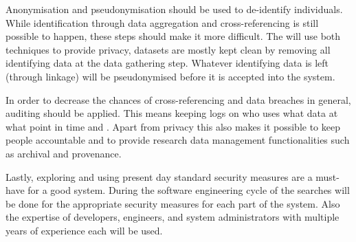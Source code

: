 Anonymisation and pseudonymisation should be used to de-identify individuals.
While identification through data aggregation and cross-referencing is still possible to happen, these steps should make it more difficult.
The \ivfsystem{} will use both techniques to provide privacy, datasets are mostly kept clean by removing all identifying data at the data gathering step.
Whatever identifying data is left (through linkage) will be pseudonymised before it is accepted into the system.

In order to decrease the chances of cross-referencing and data breaches in general, auditing should be applied.
This means keeping logs on who uses what data at what point in time and .
Apart from privacy this also makes it possible to keep people accountable and to provide research data management functionalities such as archival and provenance.

Lastly, exploring and using present day standard security measures are a must-have for a good system.
During the software engineering cycle of the \ivfsystem{} searches will be done for the appropriate security measures for each part of the system.
Also the expertise of developers, engineers, and system administrators with multiple years of experience each will be used.